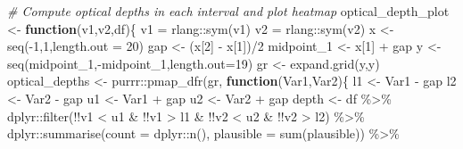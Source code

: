 \documentclass[
  12pt,
  a4paper,
  twoside]{book}
\newenvironment{Shaded}{\begin{snugshade}}{\end{snugshade}}
\newcommand{\AttributeTok}[1]{\textcolor[rgb]{0.77,0.63,0.00}{#1}}
\newcommand{\CommentTok}[1]{\textcolor[rgb]{0.56,0.35,0.01}{\textit{#1}}}
\newcommand{\ControlFlowTok}[1]{\textcolor[rgb]{0.13,0.29,0.53}{\textbf{#1}}}
\newcommand{\DecValTok}[1]{\textcolor[rgb]{0.00,0.00,0.81}{#1}}
\newcommand{\FunctionTok}[1]{\textcolor[rgb]{0.00,0.00,0.00}{#1}}
\newcommand{\NormalTok}[1]{#1}
\newcommand{\OtherTok}[1]{\textcolor[rgb]{0.56,0.35,0.01}{#1}}
\newcommand{\SpecialCharTok}[1]{\textcolor[rgb]{0.00,0.00,0.00}{#1}}
\begin{document}
\begin{Shaded}
\begin{Highlighting}[]
\CommentTok{\# Compute optical depths in each interval and plot heatmap}
\NormalTok{optical\_depth\_plot }\OtherTok{\textless{}{-}} \ControlFlowTok{function}\NormalTok{(v1,v2,df)\{}
\NormalTok{  v1 }\OtherTok{=}\NormalTok{ rlang}\SpecialCharTok{::}\FunctionTok{sym}\NormalTok{(v1)}
\NormalTok{  v2 }\OtherTok{=}\NormalTok{ rlang}\SpecialCharTok{::}\FunctionTok{sym}\NormalTok{(v2)}
\NormalTok{  x }\OtherTok{\textless{}{-}} \FunctionTok{seq}\NormalTok{(}\SpecialCharTok{{-}}\DecValTok{1}\NormalTok{,}\DecValTok{1}\NormalTok{,}\AttributeTok{length.out =} \DecValTok{20}\NormalTok{)}
\NormalTok{  gap }\OtherTok{\textless{}{-}}\NormalTok{ (x[}\DecValTok{2}\NormalTok{] }\SpecialCharTok{{-}}\NormalTok{ x[}\DecValTok{1}\NormalTok{])}\SpecialCharTok{/}\DecValTok{2}
\NormalTok{  midpoint\_1 }\OtherTok{\textless{}{-}}\NormalTok{ x[}\DecValTok{1}\NormalTok{] }\SpecialCharTok{+}\NormalTok{ gap}
\NormalTok{  y }\OtherTok{\textless{}{-}} \FunctionTok{seq}\NormalTok{(midpoint\_1,}\SpecialCharTok{{-}}\NormalTok{midpoint\_1,}\AttributeTok{length.out=}\DecValTok{19}\NormalTok{)}
\NormalTok{  gr }\OtherTok{\textless{}{-}} \FunctionTok{expand.grid}\NormalTok{(y,y)}
\NormalTok{  optical\_depths }\OtherTok{\textless{}{-}}\NormalTok{ purrr}\SpecialCharTok{::}\FunctionTok{pmap\_dfr}\NormalTok{(gr, }\ControlFlowTok{function}\NormalTok{(Var1,Var2)\{}
\NormalTok{    l1 }\OtherTok{\textless{}{-}}\NormalTok{ Var1 }\SpecialCharTok{{-}}\NormalTok{ gap}
\NormalTok{    l2 }\OtherTok{\textless{}{-}}\NormalTok{ Var2 }\SpecialCharTok{{-}}\NormalTok{ gap}
\NormalTok{    u1 }\OtherTok{\textless{}{-}}\NormalTok{ Var1 }\SpecialCharTok{+}\NormalTok{ gap}
\NormalTok{    u2 }\OtherTok{\textless{}{-}}\NormalTok{ Var2 }\SpecialCharTok{+}\NormalTok{ gap}
\NormalTok{    depth }\OtherTok{\textless{}{-}}\NormalTok{ df }\SpecialCharTok{\%\textgreater{}\%}\NormalTok{ dplyr}\SpecialCharTok{::}\FunctionTok{filter}\NormalTok{(}\SpecialCharTok{!!}\NormalTok{v1 }\SpecialCharTok{\textless{}}\NormalTok{ u1 }\SpecialCharTok{\&} \SpecialCharTok{!!}\NormalTok{v1 }\SpecialCharTok{\textgreater{}}\NormalTok{ l1 }\SpecialCharTok{\&}
                                    \SpecialCharTok{!!}\NormalTok{v2 }\SpecialCharTok{\textless{}}\NormalTok{ u2 }\SpecialCharTok{\&} \SpecialCharTok{!!}\NormalTok{v2 }\SpecialCharTok{\textgreater{}}\NormalTok{ l2) }\SpecialCharTok{\%\textgreater{}\%}
\NormalTok{      dplyr}\SpecialCharTok{::}\FunctionTok{summarise}\NormalTok{(}\AttributeTok{count =}\NormalTok{ dplyr}\SpecialCharTok{::}\FunctionTok{n}\NormalTok{(), }
                       \AttributeTok{plausible =} \FunctionTok{sum}\NormalTok{(plausible)) }\SpecialCharTok{\%\textgreater{}\%}

\end{Highlighting}
\end{Shaded}
\end{document}
